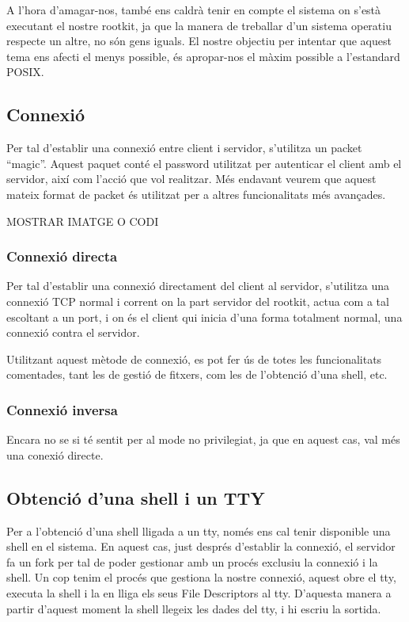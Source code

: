 A l'hora d'amagar-nos, també ens caldrà tenir en compte el sistema on s'està executant el nostre rootkit, ja que la manera de treballar
d'un sistema operatiu respecte un altre, no són gens iguals. El nostre objectiu per intentar que aquest tema ens afecti el menys possible,
és apropar-nos el màxim possible a l'estandard POSIX.

\subsection{Connexió}

Per tal d'establir una connexió entre client i servidor, s'utilitza un packet ``magic''. Aquest paquet conté el password utilitzat per 
autenticar el client amb el servidor, així com l'acció que vol realitzar. Més endavant veurem que aquest mateix format de packet és 
utilitzat per a altres funcionalitats més avançades.

MOSTRAR IMATGE O CODI

\subsubsection{Connexió directa}
Per tal d'establir una connexió directament del client al servidor, s'utilitza una connexió TCP normal i corrent on la part servidor del
rootkit, actua com a tal escoltant a un port, i on és el client qui inicia d'una forma totalment normal, una connexió contra el servidor.

Utilitzant aquest mètode de connexió, es pot fer ús de totes les funcionalitats comentades, tant les de gestió de fitxers, com les de l'obtenció
d'una shell, etc.

\subsubsection{Connexió inversa}
Encara no se si té sentit per al mode no privilegiat, ja que en aquest cas, val més una conexió directe.


\subsection{Obtenció d'una shell i un TTY}

Per a l'obtenció d'una shell lligada a un tty, només ens cal tenir disponible una shell en el sistema. En aquest cas, just després
d'establir la connexió, el servidor fa un fork per tal de poder gestionar amb un procés exclusiu la connexió i la shell. Un cop tenim
el procés que gestiona la nostre connexió, aquest obre el tty, executa la shell i la en lliga els seus File Descriptors al tty. D'aquesta manera
a partir d'aquest moment la shell llegeix les dades del tty, i hi escriu la sortida.

